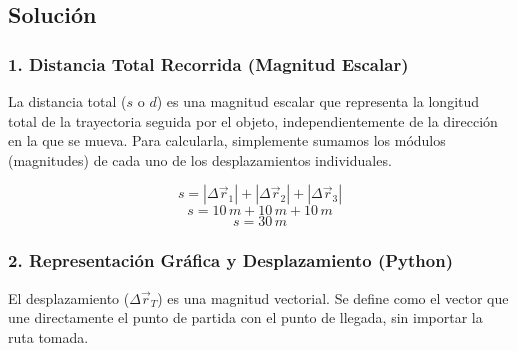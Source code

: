 \documentclass[12pt, a4paper]{article}
\begin{document}
\subsection*{Solución}

\subsubsection*{1. Distancia Total Recorrida (Magnitud Escalar)}
La distancia total ($s$ o $d$) es una magnitud escalar que representa la longitud total de la trayectoria seguida por el objeto, independientemente de la dirección en la que se mueva. Para calcularla, simplemente sumamos los módulos (magnitudes) de cada uno de los desplazamientos individuales.

$$s = |\Delta\vec{r}_1| + |\Delta\vec{r}_2| + |\Delta\vec{r}_3|$$
$$s = 10 \, \si{m} + 10 \, \si{m} + 10 \, \si{m}$$
$$s = 30 \, \si{m}$$

\subsubsection*{2. Representación Gráfica y Desplazamiento (Python)}
El desplazamiento ($\Delta\vec{r}_T$) es una magnitud vectorial. Se define como el vector que une directamente el punto de partida con el punto de llegada, sin importar la ruta tomada.
\end{document}

